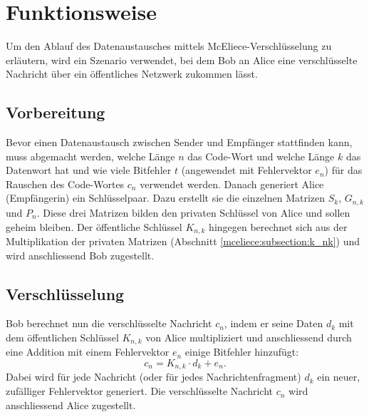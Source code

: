 %
%
%
\section{Funktionsweise 
\label{mceliece:section:funktionsweise}}
Um den Ablauf des Datenaustausches mittels McEliece-Verschlüsselung zu erläutern,
wird ein Szenario verwendet,
bei dem Bob an Alice eine verschlüsselte Nachricht über ein öffentliches Netzwerk zukommen lässt.

\subsection{Vorbereitung
\label{mceliece:section:vorbereitung}}
Bevor einen Datenaustausch zwischen Sender und Empfänger stattfinden kann,
muss abgemacht werden, welche Länge $n$ das Code-Wort und welche Länge $k$ das Datenwort hat
und wie viele Bitfehler $t$ (angewendet mit Fehlervektor $e_n$)
für das Rauschen des Code-Wortes $c_n$ verwendet werden.
Danach generiert Alice (Empfängerin) ein Schlüsselpaar.
Dazu erstellt sie die einzelnen Matrizen $S_k$, $G_{n,k}$ und $P_n$.
Diese drei Matrizen bilden den privaten Schlüssel von Alice
und sollen geheim bleiben.
Der öffentliche Schlüssel $K_{n,k}$ hingegen berechnet sich
aus der Multiplikation der privaten Matrizen (Abschnitt \ref{mceliece:subsection:k_nk})
und wird anschliessend Bob zugestellt.

\subsection{Verschlüsselung
\label{mceliece:section:verschl}}
Bob berechnet nun die verschlüsselte Nachricht $c_n$, indem er seine Daten $d_k$
mit dem öffentlichen Schlüssel $K_{n,k}$ von Alice multipliziert
und anschliessend durch eine Addition mit einem Fehlervektor $e_n$ einige Bitfehler hinzufügt:
\[
    c_n=K_{n,k}\cdot d_k + e_n.
\]
Dabei wird für jede Nachricht (oder für jedes Nachrichtenfragment) $d_k$
ein neuer, zufälliger Fehlervektor generiert.
Die verschlüsselte Nachricht $c_n$ wird anschliessend Alice zugestellt.

